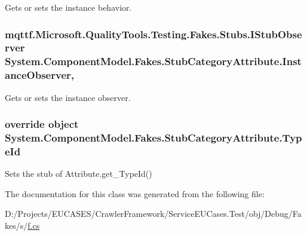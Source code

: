Gets or sets the instance behavior.

\hypertarget{class_system_1_1_component_model_1_1_fakes_1_1_stub_category_attribute_a1131d3cfe3c27c60f558da33002e2055}{
\subsubsection[{Instance\-Observer}]{\setlength{\rightskip}{0pt plus 5cm}mqttf.\-Microsoft.\-Quality\-Tools.\-Testing.\-Fakes.\-Stubs.\-I\-Stub\-Observer System.\-Component\-Model.\-Fakes.\-Stub\-Category\-Attribute.\-Instance\-Observer\hspace{0.3cm}{\ttfamily [get]}, {\ttfamily [set]}}}\label{class_system_1_1_component_model_1_1_fakes_1_1_stub_category_attribute_a1131d3cfe3c27c60f558da33002e2055}


Gets or sets the instance observer.

\hypertarget{class_system_1_1_component_model_1_1_fakes_1_1_stub_category_attribute_ae250ab73aca029ecd68c4b8bb545a6c3}{
\subsubsection[{Type\-Id}]{\setlength{\rightskip}{0pt plus 5cm}override object System.\-Component\-Model.\-Fakes.\-Stub\-Category\-Attribute.\-Type\-Id\hspace{0.3cm}{\ttfamily [get]}}}\label{class_system_1_1_component_model_1_1_fakes_1_1_stub_category_attribute_ae250ab73aca029ecd68c4b8bb545a6c3}


Sets the stub of Attribute.\-get\-\_\-\-Type\-Id()



The documentation for this class was generated from the following file\-:\begin{DoxyCompactItemize}
\item 
D\-:/\-Projects/\-E\-U\-C\-A\-S\-E\-S/\-Crawler\-Framework/\-Service\-E\-U\-Cases.\-Test/obj/\-Debug/\-Fakes/s/\hyperlink{s_2f_8cs}{f.\-cs}\end{DoxyCompactItemize}
